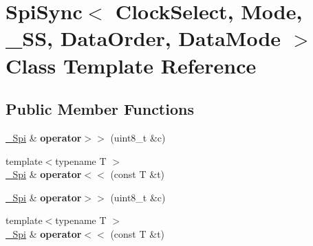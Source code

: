 \hypertarget{classSpiSync}{}\section{Spi\+Sync$<$ Clock\+Select, Mode, \+\_\+\+SS, Data\+Order, Data\+Mode $>$ Class Template Reference}
\label{classSpiSync}
\subsection*{Public Member Functions}
\begin{DoxyCompactItemize}
\item 
\hypertarget{classSpiSync_a33585d15d7e75a24d7f31e832f719542}{}\label{classSpiSync_a33585d15d7e75a24d7f31e832f719542} 
\hyperlink{classSpiSync}{\+\_\+\+Spi} \& {\bfseries operator$>$$>$} (uint8\+\_\+t \&c)
\item 
\hypertarget{classSpiSync_a04a99b76a571984344ee58ccd7510534}{}\label{classSpiSync_a04a99b76a571984344ee58ccd7510534} 
{\footnotesize template$<$typename T $>$ }\\\hyperlink{classSpiSync}{\+\_\+\+Spi} \& {\bfseries operator$<$$<$} (const T \&t)
\item 
\hypertarget{classSpiSync_a33585d15d7e75a24d7f31e832f719542}{}\label{classSpiSync_a33585d15d7e75a24d7f31e832f719542} 
\hyperlink{classSpiSync}{\+\_\+\+Spi} \& {\bfseries operator$>$$>$} (uint8\+\_\+t \&c)
\item 
\hypertarget{classSpiSync_a04a99b76a571984344ee58ccd7510534}{}\label{classSpiSync_a04a99b76a571984344ee58ccd7510534} 
{\footnotesize template$<$typename T $>$ }\\\hyperlink{classSpiSync}{\+\_\+\+Spi} \& {\bfseries operator$<$$<$} (const T \&t)
\end{DoxyCompactItemize}
